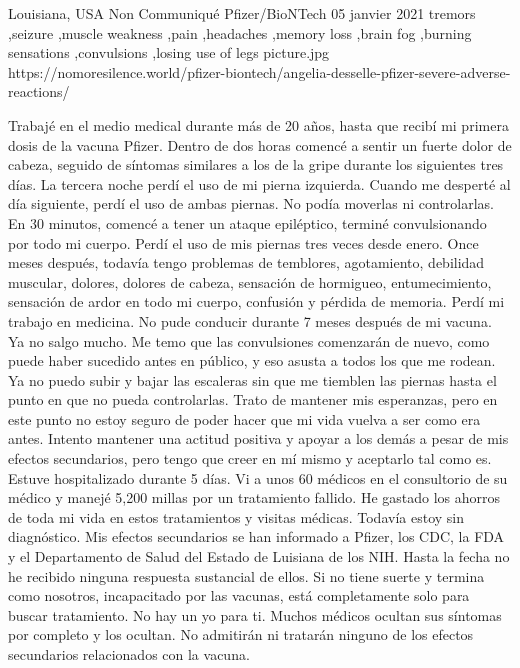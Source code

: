           {Louisiana, USA}
          {Non Communiqué}
          {Pfizer/BioNTech}
          {05 janvier 2021}
          {
            tremors
            ,seizure
            ,muscle weakness
            ,pain
            ,headaches
            ,memory loss
            ,brain fog
            ,burning sensations
            ,convulsions
            ,losing use of legs
          }
          {picture.jpg}
          {https://nomoresilence.world/pfizer-biontech/angelia-desselle-pfizer-severe-adverse-reactions/}
          {

Trabajé en el medio medical durante más de 20 años, hasta que recibí mi primera
dosis de la vacuna Pfizer. Dentro de dos horas comencé a sentir un fuerte dolor
de cabeza, seguido de síntomas similares a los de la gripe durante los
siguientes tres días. La tercera noche perdí el uso de mi pierna
izquierda. Cuando me desperté al día siguiente, perdí el uso de ambas
piernas. No podía moverlas ni controlarlas. En 30 minutos, comencé a tener un
ataque epiléptico, terminé convulsionando por todo mi cuerpo. Perdí el uso de
mis piernas tres veces desde enero. Once meses después, todavía tengo problemas
de temblores, agotamiento, debilidad muscular, dolores, dolores de cabeza,
sensación de hormigueo, entumecimiento, sensación de ardor en todo mi cuerpo,
confusión y pérdida de memoria. Perdí mi trabajo en medicina. No pude conducir
durante 7 meses después de mi vacuna. Ya no salgo mucho. Me temo que las
convulsiones comenzarán de nuevo, como puede haber sucedido antes en público, y
eso asusta a todos los que me rodean. Ya no puedo subir y bajar las escaleras
sin que me tiemblen las piernas hasta el punto en que no pueda
controlarlas. Trato de mantener mis esperanzas, pero en este punto no estoy
seguro de poder hacer que mi vida vuelva a ser como era antes. Intento mantener
una actitud positiva y apoyar a los demás a pesar de mis efectos secundarios,
pero tengo que creer en mí mismo y aceptarlo tal como es. Estuve hospitalizado
durante 5 días. Vi a unos 60 médicos en el consultorio de su médico y manejé
5,200 millas por un tratamiento fallido. He gastado los ahorros de toda mi vida
en estos tratamientos y visitas médicas. Todavía estoy sin diagnóstico. Mis
efectos secundarios se han informado a Pfizer, los CDC, la FDA y el Departamento
de Salud del Estado de Luisiana de los NIH. Hasta la fecha no he recibido
ninguna respuesta sustancial de ellos. Si no tiene suerte y termina como
nosotros, incapacitado por las vacunas, está completamente solo para buscar
tratamiento. No hay un yo para ti. Muchos médicos ocultan sus síntomas por
completo y los ocultan. No admitirán ni tratarán ninguno de los efectos
secundarios relacionados con la vacuna.

}
